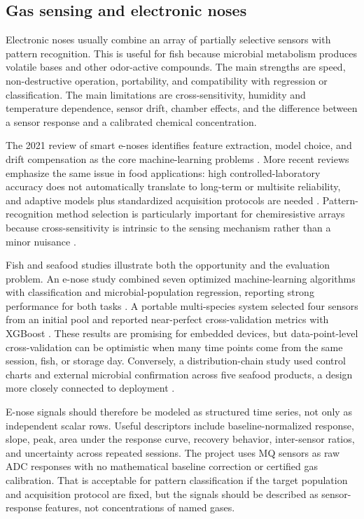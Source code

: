 \documentclass[11pt]{article}
\begin{document}
\subsection{Gas sensing and electronic noses}

Electronic noses usually combine an array of partially selective sensors with pattern recognition. This is useful for fish because microbial metabolism produces volatile bases and other odor-active compounds. The main strengths are speed, non-destructive operation, portability, and compatibility with regression or classification. The main limitations are cross-sensitivity, humidity and temperature dependence, sensor drift, chamber effects, and the difference between a sensor response and a calibrated chemical concentration.

The 2021 review of smart e-noses identifies feature extraction, model choice, and drift compensation as the core machine-learning problems \citep{Ye2021recent}. More recent reviews emphasize the same issue in food applications: high controlled-laboratory accuracy does not automatically translate to long-term or multisite reliability, and adaptive models plus standardized acquisition protocols are needed \citep{Sanislav2025comprehensive,Ivanov2025modern,Zong2025smart}. Pattern-recognition method selection is particularly important for chemiresistive arrays because cross-sensitivity is intrinsic to the sensing mechanism rather than a minor nuisance \citep{Mei2024overcoming}.

Fish and seafood studies illustrate both the opportunity and the evaluation problem. An e-nose study combined seven optimized machine-learning algorithms with classification and microbial-population regression, reporting strong performance for both tasks \citep{Wijaya2023seafood}. A portable multi-species system selected four sensors from an initial pool and reported near-perfect cross-validation metrics with XGBoost \citep{Setyagraha2025portable}. These results are promising for embedded devices, but data-point-level cross-validation can be optimistic when many time points come from the same session, fish, or storage day. Conversely, a distribution-chain study used control charts and external microbial confirmation across five seafood products, a design more closely connected to deployment \citep{Buratti2025nose}.

E-nose signals should therefore be modeled as structured time series, not only as independent scalar rows. Useful descriptors include baseline-normalized response, slope, peak, area under the response curve, recovery behavior, inter-sensor ratios, and uncertainty across repeated sessions. The project uses MQ sensors as raw ADC responses with no mathematical baseline correction or certified gas calibration. That is acceptable for pattern classification if the target population and acquisition protocol are fixed, but the signals should be described as sensor-response features, not concentrations of named gases.
\end{document}
